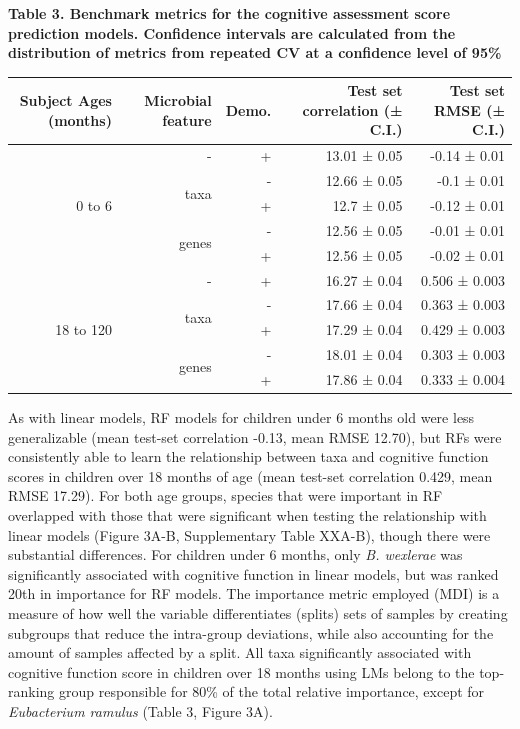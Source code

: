 \documentclass{article}
\begin{document}
\textbf{Table 3. Benchmark metrics for the cognitive assessment score
prediction models. Confidence intervals are calculated from the
distribution of metrics from repeated CV at a confidence level of 95\%}

\begin{table}
    \begin{tabular}{|r|r|r|r|r|}
      \hline\hline
      \textbf{Subject Ages (months)} & \textbf{Microbial feature} & \textbf{Demo.} & \textbf{Test set correlation (± C.I.)} & \textbf{Test set RMSE (± C.I.)} \\\hline
      \multirow{5}{*}{0 to 6} & - & + & 13.01 ± 0.05 & -0.14 ± 0.01 \\ \cline{2-5}
            & \multirow{2}{*}{taxa} & - & 12.66 ± 0.05 & -0.1 ± 0.01 \\ \cline{3-5}
            &       & + & 12.7 ± 0.05 & -0.12 ± 0.01 \\ \cline{2-5}
            & \multirow{2}{*}{genes} & - & 12.56 ± 0.05 & -0.01 ± 0.01 \\ \cline{3-5}
            &       & + & 12.56 ± 0.05 & -0.02 ± 0.01 \\ \cline{1-5}
      \multirow{5}{*}{18 to 120} & - & + & 16.27 ± 0.04 & 0.506 ± 0.003 \\ \cline{2-5}
            & \multirow{2}{*}{taxa} & - & 17.66 ± 0.04 & 0.363 ± 0.003 \\ \cline{3-5}
            &       & + & 17.29 ± 0.04 & 0.429 ± 0.003 \\ \cline{2-5}
            & \multirow{2}{*}{genes} & - & 18.01 ± 0.04 & 0.303 ± 0.003 \\ \cline{3-5}
            &       & + & 17.86 ± 0.04 & 0.333 ± 0.004 \\\hline\hline
    \end{tabular}
\end{table}

As with linear models, RF models for children under 6 months old were
less generalizable (mean test-set correlation -0.13, mean RMSE 12.70),
but RFs were consistently able to learn the relationship between taxa
and cognitive function scores in children over 18 months of age (mean
test-set correlation 0.429, mean RMSE 17.29). For both age groups,
species that were important in RF overlapped with those that were
significant when testing the relationship with linear models (Figure
3A-B, Supplementary Table XXA-B), though there were substantial
differences. For children under 6 months, only \emph{B. wexlerae} was
significantly associated with cognitive function in linear models, but
was ranked 20th in importance for RF models. The importance metric
employed (MDI) is a measure of how well the variable differentiates
(splits) sets of samples by creating subgroups that reduce the
intra-group deviations, while also accounting for the amount of samples
affected by a split. All taxa significantly associated with cognitive
function score in children over 18 months using LMs belong to the
top-ranking group responsible for 80\% of the total relative importance,
except for \emph{Eubacterium ramulus} (Table 3, Figure 3A).
\end{document}
